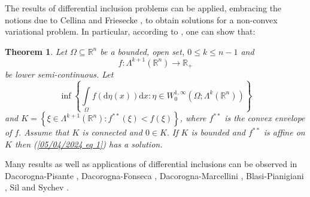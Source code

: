 \documentclass[11pt, a4paper, reqno]{amsart}
\numberwithin{equation}{section}
\newtheorem{theorem}{Theorem}[section]
\begin{document}
The results of differential inclusion problems can be applied, embracing the notions due to Cellina \cite{cellina1993minima,cellina1993minimanecessary} and Friesecke \cite{Friesecke}, to obtain solutions for a non-convex variational problem. In particular, according to \cite{bandyopadhyay2007differential}, one can show that: 
\begin{theorem}
    Let $\Omega\subseteq \mathbb R^n$ be a bounded, open set, $0\leq k\leq n-1$ and $$f:\Lambda^{k+1}(\mathbb R^n)\to \mathbb R_{+}$$
    be lower semi-continuous. Let 
 \begin{equation}\label{05/04/2024 eq 1} 
        \inf \left\{\displaystyle\int\limits_{\Omega}f(\textrm{d}\eta(x))\textrm{d}x:\eta\in W_{0}^{1,\infty}\left(\Omega;\Lambda^k(\mathbb R^n)\right)\right\}
    \end{equation}
    and $K=\left\{\xi \in \Lambda^{k+1}(\mathbb R^n):f^{**}(\xi)<f(\xi)\right\}$, where $f^{**}$ is the convex envelope of $f.$ Assume that $K$ is connected and $0\in K.$ If $K$ is bounded and $f^{**}$ is affine on $K$ then (\ref{05/04/2024 eq 1}) has a solution.
\end{theorem}
Many results as well as applications of differential inclusions can be observed in Dacorogna-Pisante \cite{PisanteDacorogna}, Dacorogna-Fonseca \cite{DacorognaFonseca}, Dacorogna-Marcellini \cite{DacorognaMarcellini}, Blasi-Pianigiani \cite{BlasiPianigiani}, Sil \cite{SwarnenduACV} and Sychev \cite{Sychev}.
\end{document}
